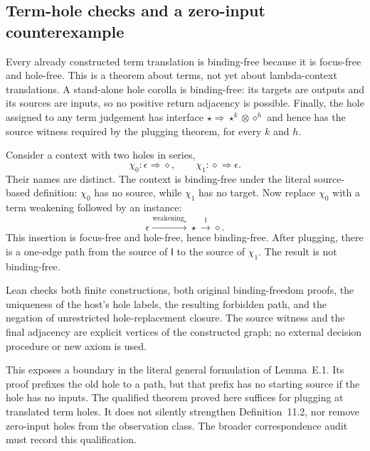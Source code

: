 



\subsection{Term-hole checks and a zero-input counterexample}


Every already constructed term translation is binding-free because it is
focus-free and hole-free. This is a theorem about terms, not yet about
lambda-context translations. A stand-alone hole corolla is binding-free:
its targets are outputs and its sources are inputs, so no positive return
adjacency is possible. Finally, the hole assigned to any term judgement has
interface $\star\Rightarrow\star^k\otimes\diamond^h$ and hence has the
source witness required by the plugging theorem, for every $k$ and $h$.







Consider a context with two holes in series,
\[
 \chi_0: \epsilon\Rightarrow\diamond,
 \qquad \chi_1:\diamond\Rightarrow\epsilon.
\]
Their names are distinct. The context is binding-free under the literal
source-based definition: $\chi_0$ has no source, while $\chi_1$ has no target.
Now replace $\chi_0$ with a term weakening followed by an instance:
\[
 \epsilon\xrightarrow{\mathrm{weakening}_\star}\star
 \xrightarrow{\mathsf I}\diamond.
\]
This insertion is focus-free and hole-free, hence binding-free. After plugging,
there is a one-edge path from the source of $\mathsf I$ to the source of
$\chi_1$. The result is not binding-free.

Lean checks both finite constructions, both original binding-freedom proofs,
the uniqueness of the host's hole labels, the resulting forbidden path, and
the negation of unrestricted hole-replacement closure. The source witness
and the final adjacency are explicit vertices of the constructed graph;
no external decision procedure or new axiom is used.

This exposes a boundary in the literal general formulation of Lemma~E.1.
Its proof prefixes the old hole to a path, but that prefix has no starting
source if the hole has no inputs. The qualified theorem proved here suffices
for plugging at translated term holes. It does not silently strengthen
Definition~11.2, nor remove zero-input holes from the observation class.
The broader correspondence audit must record this qualification.

